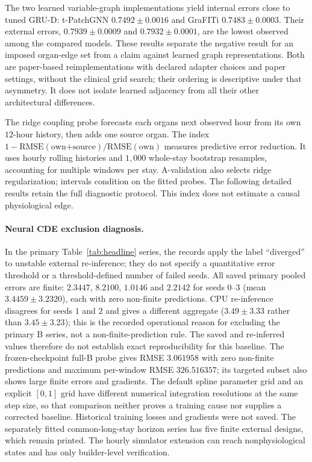 The two learned variable-graph implementations yield internal errors close to tuned GRU-D: t-PatchGNN $0.7492\pm0.0016$ and GraFITi $0.7483\pm0.0003$. Their external errors, $0.7939\pm0.0009$ and $0.7932\pm0.0001$, are the lowest observed among the compared models. These results separate the negative result for an imposed organ-edge set from a claim against learned graph representations. Both are paper-based reimplementations with declared adapter choices and paper settings, without the clinical grid search; their ordering is descriptive under that asymmetry. It does not isolate learned adjacency from all their other architectural differences.

The ridge coupling probe forecasts each organ\textquotesingle s next observed hour from its own $12$-hour history, then adds one source organ. The index $1-\mathrm{RMSE}(\text{own+source})/\mathrm{RMSE}(\text{own})$ measures predictive error reduction. It uses hourly rolling histories and $1{,}000$ whole-stay bootstrap resamples, accounting for multiple windows per stay. A-validation also selects ridge regularization; intervals condition on the fitted probes. The following detailed results retain the full diagnostic protocol. This index does not estimate a causal physiological edge.

\paragraph{Neural CDE exclusion diagnosis.}\label{app:ncdediagnosis}
In the primary Table~\ref{tab:headline} series, the records apply the label ``diverged'' to unstable external re-inference; they do not specify a quantitative error threshold or a threshold-defined number of failed seeds. All saved primary pooled errors are finite: $2.3447$, $8.2100$, $1.0146$ and $2.2142$ for seeds $0$--$3$ (mean $3.4459\pm3.2320$), each with zero non-finite predictions. CPU re-inference disagrees for seeds $1$ and $2$ and gives a different aggregate ($3.49\pm3.33$ rather than $3.45\pm3.23$); this is the recorded operational reason for excluding the primary B series, not a non-finite-prediction rule. The saved and re-inferred values therefore do not establish exact reproducibility for this baseline. The frozen-checkpoint full-B probe gives RMSE $3.061958$ with zero non-finite predictions and maximum per-window RMSE $326.516357$; its targeted subset also shows large finite errors and gradients. The default spline parameter grid and an explicit $[0,1]$ grid have different numerical integration resolutions at the same step size, so that comparison neither proves a training cause nor supplies a corrected baseline. Historical training losses and gradients were not saved. The separately fitted common-long-stay horizon series has five finite external designs, which remain printed. The hourly simulator extension can reach nonphysiological states and has only builder-level verification.



